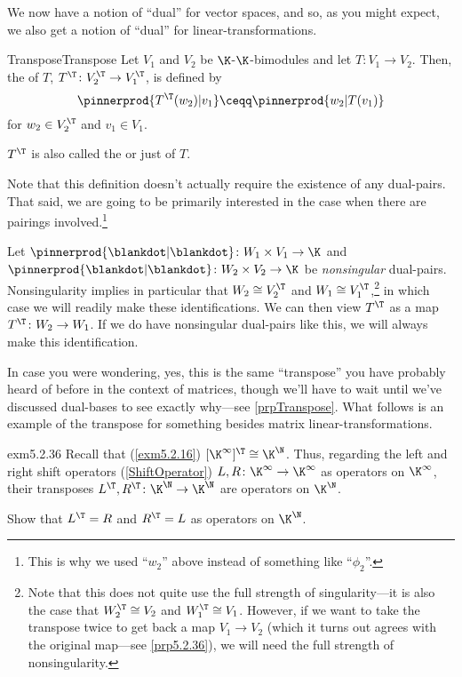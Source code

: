We now have a notion of ``dual'' for vector spaces, and so, as you might expect, we also get a notion of ``dual'' for linear-transformations.
\begin{dfn}{Transpose}{Transpose}
	Let $V_1$ and $V_2$ be $\K$-$\K$-bimodules and let $T\colon V_1\rightarrow V_2$.  Then, the  of $T$, $T^{\T}\colon V_2^{\T}\rightarrow V_1^{\T}$, is defined by
	\begin{equation}
		\pinnerprod{T^{\T}(w_2)|v_1}\ceqq \pinnerprod{w_2|T(v_1)}
	\end{equation}
	for $w_2\in V_2^{\T}$ and $v_1\in V_1$.
	\begin{rmk}
		$T^{\T}$ is also called the  or just  of $T$.
	\end{rmk}
	\begin{rmk}
		Note that this definition doesn't actually require the existence of any dual-pairs.  That said, we are going to be primarily interested in the case when there are pairings involved.\footnote{This is why we used ``$w_2$'' above instead of something like ``$\phi _2$''.}
		
		Let $\pinnerprod{\blankdot |\blankdot}\colon W_1\times V_1\rightarrow \K$ and $\pinnerprod{\blankdot |\blankdot}\colon W_2\times V_2\rightarrow \K$ be \emph{nonsingular} dual-pairs.  Nonsingularity implies in particular that $W_2\cong V_2^{\T}$ and $W_1\cong V_1^{\T}$,\footnote{Note that this does not quite use the full strength of singularity---it is also the case that $W_2^{\T}\cong V_2$ and $W_1^{\T}\cong V_1$.  However, if we want to take the transpose twice to get back a map $V_1\rightarrow V_2$ (which it turns out agrees with the original map---see \cref{prp5.2.36}), we will need the full strength of nonsingularity.} in which case we will readily make these identifications.  We can then view $T^{\T}$ as a map $T^{\T}\colon W_2\rightarrow W_1$.  If we do have nonsingular dual-pairs like this, we will always make this identification.
	\end{rmk}
\end{dfn}
In case you were wondering, yes, this is the same ``transpose'' you have probably heard of before in the context of matrices, though we'll have to wait until we've discussed dual-bases to see exactly why---see \cref{prpTranspose}.  What follows is an example of the transpose for something besides matrix linear-transformations.
\begin{exm}{}{exm5.2.36}
	Recall that (\cref{exm5.2.16}) $[\K ^{\infty}]^{\T}\cong \K ^{\N}$.  Thus, regarding the left and right shift operators (\cref{ShiftOperator}) $L,R\colon \K ^{\infty}\rightarrow \K ^{\infty}$ as operators on $\K ^{\infty}$, their transposes $L^{\T},R^{\T}\colon \K ^{\N}\rightarrow \K ^{\N}$ are operators on $\K ^{\N}$.
	\begin{exr}[breakable=false]{}{}
		Show that $L^{\T}=R$ and $R^{\T}=L$ as operators on $\K ^{\N}$.
	\end{exr}
\end{exm}
